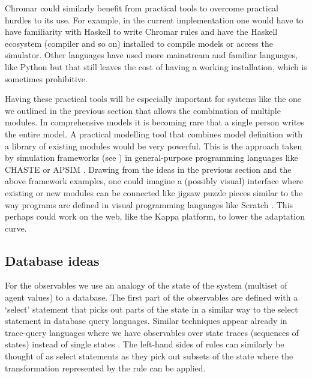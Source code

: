 Chromar could similarly benefit from practical tools to overcome practical
hurdles to its use. For example, in the current implementation one would have to
have familiarity with Haskell to write Chromar rules and have the Haskell
ecosystem (compiler and so on) installed to compile models or access the
simulator. Other languages have used more mainstream and familiar languages,
like Python \citep[Kappa or L-systems in Python;][]{lopez_programming_2013,
  boudon2012py} but that still leaves the cost of having a working installation,
which is sometimes prohibitive.

Having these practical tools will be especially important for systems like the
one we outlined in the previous section that allows the combination of multiple
modules. In comprehensive models it is becoming rare that a single person writes
the entire model. A practical modelling tool that combines model definition with
a library of existing modules would be very powerful. This is the approach taken
by simulation frameworks (see ) in general-purpose
programming languages like CHASTE \citep[suite of software for heart
simulation][]{mirams2013chaste} or APSIM \citep[crop
modelling][]{keating_overview_2003}. Drawing from the ideas in the previous
section and the above framework examples, one could imagine a (possibly visual)
interface where existing or new modules can be connected like jigsaw puzzle
pieces similar to the way programs are defined in visual programming languages
like Scratch \citep{maloney_scratch_2010}. This perhaps could work on the web,
like the Kappa platform, to lower the adaptation curve.

\subsection{Database ideas}
For the observables we use an analogy of the state of the system (multiset of
agent values) to a database. The first part of the observables are defined with
a `select' statement that picks out parts of the state in a similar way to the
select statement in database query languages. Similar techniques appear already
in trace-query languages where we have observables over state traces (sequences
of states) instead of single states \citep{laurent_trace_2018}. The left-hand
sides of rules can similarly be thought of as select statements as they pick out
subsets of the state where the transformation represented by the rule can be
applied.


